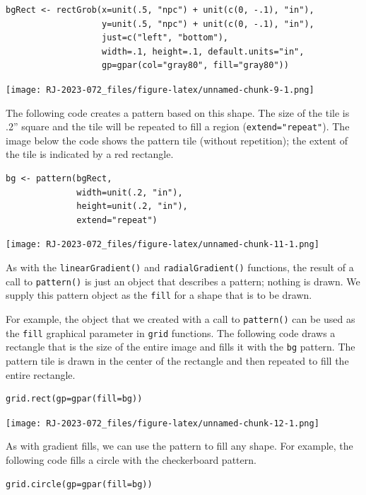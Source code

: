 \begin{verbatim}
bgRect <- rectGrob(x=unit(.5, "npc") + unit(c(0, -.1), "in"),
                   y=unit(.5, "npc") + unit(c(0, -.1), "in"),
                   just=c("left", "bottom"),
                   width=.1, height=.1, default.units="in",
                   gp=gpar(col="gray80", fill="gray80"))
\end{verbatim}

\texttt{[image: RJ-2023-072\_files/figure-latex/unnamed-chunk-9-1.png]}

The following code creates a pattern based on this shape.
The size of the tile is .2'' square and the tile will be repeated
to fill a region
(\texttt{extend="repeat"}).
The image below the code shows the pattern tile (without repetition);
the extent of the tile is indicated by a red rectangle.

\begin{verbatim}
bg <- pattern(bgRect,
              width=unit(.2, "in"),
              height=unit(.2, "in"),
              extend="repeat")
\end{verbatim}

\texttt{[image: RJ-2023-072\_files/figure-latex/unnamed-chunk-11-1.png]}

As with the \texttt{linearGradient()} and \texttt{radialGradient()} functions,
the result of a call to \texttt{pattern()} is just an object that describes a pattern;
nothing is drawn. We supply this pattern object as the \texttt{fill} for a shape
that is to be drawn.

For example, the object that we created with a call
to \texttt{pattern()} can be used as the \texttt{fill} graphical parameter
in \texttt{grid} functions. The following code draws a rectangle that is
the size of the entire image and fills it with the \texttt{bg} pattern.
The pattern tile is drawn in the center of the rectangle and
then repeated to fill the entire rectangle.

\begin{verbatim}
grid.rect(gp=gpar(fill=bg))  
\end{verbatim}

\texttt{[image: RJ-2023-072\_files/figure-latex/unnamed-chunk-12-1.png]}

As with gradient fills, we can use the pattern to fill any shape.
For example, the following code fills a circle with the checkerboard
pattern.

\begin{verbatim}
grid.circle(gp=gpar(fill=bg))  
\end{verbatim}

